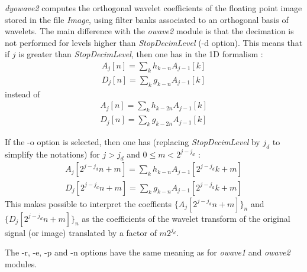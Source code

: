 \parindent 0.6cm 
\parskip 0.4cm

{\em dyowave2} computes the orthogonal wavelet coefficients  
of the floating point image stored in the file {\em Image}, 
using filter banks associated to an orthogonal basis of wavelets. 
The main difference with the {\em owave2} module is that the decimation 
is not performed for levels higher than {\em StopDecimLevel} (-d option). 
This means that if $j$ is greater than {\em StopDecimLevel}, then one has 
in the 1D formalism : 
\begin{eqnarray*}
A_{j}[n] = \sum_{k} h_{k-n} A_{j-1}[k] \\
D_{j}[n] = \sum_{k} g_{k-n} A_{j-1}[k] 
\end{eqnarray*}
instead of
\begin{eqnarray*}
A_{j}[n] = \sum_{k} h_{k-2n} A_{j-1}[k] \\
D_{j}[n] = \sum_{k} g_{k-2n} A_{j-1}[k] 
\end{eqnarray*}

If the -o option is selected, then one has (replacing {\em StopDecimLevel} 
by $j_d$ to simplify the notations) for $j > j_d$ and $0\leq m < 2^{j-j_d}$ : 
\begin{eqnarray*}
A_{j}[2^{j-j_d}n+m] = \sum_{k} h_{k-n} A_{j-1}[2^{j-j_d}k+m] \\
D_{j}[2^{j-j_d}n+m] = \sum_{k} g_{k-n} A_{j-1}[2^{j-j_d}k+m] 
\end{eqnarray*}
This makes possible to interpret the coeffients $\{A_{j}[2^{j-j_d}n+m]\}_n$ 
and $\{D_{j}[2^{j-j_d}n+m]\}_n$ as the coefficients of the wavelet transform 
of the original signal (or image) translated by a factor of $m2^{j_d}$.

The -r, -e, -p and -n options have the same meaning as for {\em owave1} and 
{\em owave2} modules. 




\parindent 0.0cm 
\parskip 0.0cm
